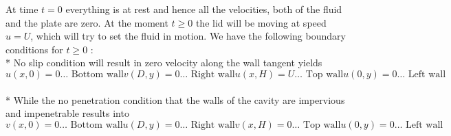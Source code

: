 \documentclass{article}
\begin{document}
At time $t=0$ everything is at rest and hence all the velocities, both of the fluid and the plate are zero. At the moment $t \geq0$ the lid will be moving at speed $u=U$, which will try to set the fluid in motion. We have the following boundary conditions for $t\geq0$ :
\\*
No slip condition will result in zero velocity along the wall tangent yields
\begin{subequations}
\begin{equation}
u(x,0)=0  \dots \text{ Bottom wall}
\end{equation}
\begin{equation}
v(D,y)=0 \dots \text{ Right wall}
\end{equation}
\begin{equation}
u(x,H)=U \dots \text{ Top wall}
\end{equation}
\begin{equation}
u(0,y)=0 \dots \text{ Left wall}
\end{equation}
\end{subequations}
\\*
While the no penetration condition that the walls of the cavity are impervious and impenetrable results into
\begin{subequations}
\begin{equation} 
v(x,0)=0 \dots \text{ Bottom wall}
\end{equation}
\begin{equation}
u(D,y)=0 \dots \text{ Right wall}
\end{equation}
\begin{equation}
v(x,H)=0 \dots \text{ Top wall}
\end{equation}
\begin{equation}
u(0,y)=0 \dots \text{ Left wall}
\end{equation}
\end{subequations}
\end{document}
